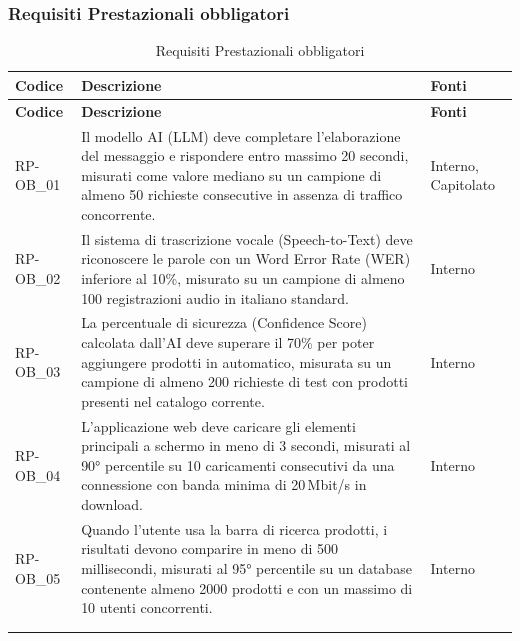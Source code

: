 \subsubsection{Requisiti Prestazionali obbligatori}
\renewcommand{\arraystretch}{1.15}
\begin{longtable}{|>{\raggedright}p{}|>{\raggedright\arraybackslash}p{}|>{\raggedright\arraybackslash}p{}|}

    \hline
    \rowcolor[gray]{0.9}
    \textbf{Codice} & \textbf{Descrizione} & \textbf{Fonti} \\
    \hline
    \endfirsthead
    
    \hline
    \rowcolor[gray]{0.9}
    \textbf{Codice} & \textbf{Descrizione} & \textbf{Fonti}  \\
    \hline
    \endhead

    \hline
    RP-OB\_01 \hypertarget{rp-ob_1} & Il modello AI (LLM) deve completare l'elaborazione del messaggio e rispondere entro massimo 20 secondi, misurati come valore mediano su un campione di almeno 50 richieste consecutive in assenza di traffico concorrente. & Interno, Capitolato \\
    \hline
    RP-OB\_02 \hypertarget{rp-ob_2} & Il sistema di trascrizione vocale (Speech-to-Text) deve riconoscere le parole con un Word Error Rate (WER) inferiore al 10\%, misurato su un campione di almeno 100 registrazioni audio in italiano standard. & Interno \\
    \hline
    RP-OB\_03 \hypertarget{rp-ob_3} & La percentuale di sicurezza (Confidence Score) calcolata dall'AI deve superare il 70\% per poter aggiungere prodotti in automatico, misurata su un campione di almeno 200 richieste di test con prodotti presenti nel catalogo corrente. & Interno \\
    \hline
    RP-OB\_04 \hypertarget{rp-ob_4} & L'applicazione web deve caricare gli elementi principali a schermo in meno di 3 secondi, misurati al 90° percentile su 10 caricamenti consecutivi da una connessione con banda minima di 20\,Mbit/s in download. & Interno \\
    \hline
    RP-OB\_05 \hypertarget{rp-ob_5} & Quando l'utente usa la barra di ricerca prodotti, i risultati devono comparire in meno di 500 millisecondi, misurati al 95° percentile su un database contenente almeno 2000 prodotti e con un massimo di 10 utenti concorrenti. & Interno \\
    \hline
    \multicolumn{3}{c}{} \\
    \caption{Requisiti Prestazionali obbligatori}\hypertarget{tab:prestazionali_obbligatori}\\
\end{longtable}


